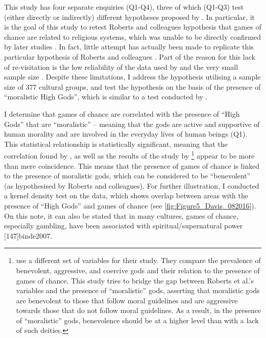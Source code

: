 \documentclass[%
	]{ijsra}
\begin{document}

This study has four separate enquiries (Q1-Q4), three of which (Q1-Q3) test (either directly or indirectly) different hypotheses proposed by \textcite{roberts1959}. In particular, it is the goal of this study to retest Roberts and colleagues hypothesis that games of chance are related to religious systems, which was unable to be directly confirmed by later studies \parencites[e.g.][]{ball1972}{chick1998}. In fact, little attempt has actually been made to replicate this particular hypothesis of Roberts and colleagues \parencite[18]{binde2005}. Part of the reason for this lack of re-visitation is the low reliability of the data used by \textcite{roberts1959} and the very small sample size \parencite[18]{binde2005}. Despite these limitations, I address the hypothesis utilising a sample size of 377 cultural groups, and test the hypothesis on the basis of the presence of ``moralistic High Gods”, which is similar to a test conducted by \textcite{ball1972}. 

I determine that games of chance are correlated with the presence of ``High Gods” that are ``moralistic” – meaning that the gods are active and supportive of human morality and are involved in the everyday lives of human beings (Q1). This statistical relationship is statistically significant, meaning that the correlation found by \textcite{ball1972}, as well as the results of the study by \textcite{roberts1959}\footnote{\textcite{roberts1959} use a different set of variables for their study. They compare the prevalence of benevolent, aggressive, and coercive gods and their relation to the presence of games of chance. This study tries to bridge the gap between Roberts et al.’s variables and the presence of ``moralistic” gods, asserting that moralistic gods are benevolent to those that follow moral guidelines and are aggressive towards those that do not follow moral guidelines. As a result, in the presence of ``moralistic” gods, benevolence should be at a higher level than with a lack of such deities.}  appear to be more than mere coincidence. This means that the presence of games of chance is linked to the presence of moralistic gods, which can be considered to be ``benevolent” (as hypothesised by Roberts and colleagues). For further illustration, I conducted a kernel density test on the data, which shows overlap between areas with the presence of ``High Gods” and games of chance (see \cref{fig:Figure5_Davis_082016}). On this note, it can also be stated that in many cultures, games of chance, especially gambling, have been associated with spiritual/supernatural power \parencite[22]{binde2005}[147]{binde2007}.
\end{document}

